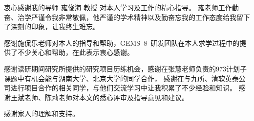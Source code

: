 
\begin{ack}

  衷心感谢我的导师 雍俊海 教授 对本人学习及工作的精心指导。
  雍老师工作勤奋、治学严谨令我非常敬佩，他严谨的学术精神以及勤奋忘我的工作态度给我留下了深刻的印象，让我终生难忘。
  
  感谢施侃乐老师对本人的指导和帮助，GEMS~8~研发团队在本人求学过程中的提供了不少关心和帮助，在此表示衷心感谢。
  
  感谢读研期间研究所提供的研究项目历练机会，感谢在张慧老师负责的973计划子课题中有机会能与湖南大学、北京大学的同学合作，
  感谢在与九所、清软英泰公司进行项目合作的相关同学，与他们交流学习中让我积累了不少经验和知识。
  感谢王斌老师、陈莉老师对本文的悉心评审及指导意见和建议。

  感谢家人的理解和支持。

\end{ack}
